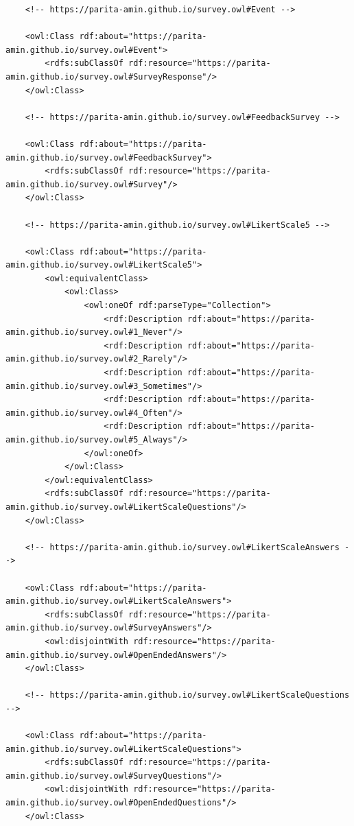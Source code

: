\begin{lstlisting}
    <!-- https://parita-amin.github.io/survey.owl#Event -->

    <owl:Class rdf:about="https://parita-amin.github.io/survey.owl#Event">
        <rdfs:subClassOf rdf:resource="https://parita-amin.github.io/survey.owl#SurveyResponse"/>
    </owl:Class>
    
    <!-- https://parita-amin.github.io/survey.owl#FeedbackSurvey -->

    <owl:Class rdf:about="https://parita-amin.github.io/survey.owl#FeedbackSurvey">
        <rdfs:subClassOf rdf:resource="https://parita-amin.github.io/survey.owl#Survey"/>
    </owl:Class>
    
    <!-- https://parita-amin.github.io/survey.owl#LikertScale5 -->

    <owl:Class rdf:about="https://parita-amin.github.io/survey.owl#LikertScale5">
        <owl:equivalentClass>
            <owl:Class>
                <owl:oneOf rdf:parseType="Collection">
                    <rdf:Description rdf:about="https://parita-amin.github.io/survey.owl#1_Never"/>
                    <rdf:Description rdf:about="https://parita-amin.github.io/survey.owl#2_Rarely"/>
                    <rdf:Description rdf:about="https://parita-amin.github.io/survey.owl#3_Sometimes"/>
                    <rdf:Description rdf:about="https://parita-amin.github.io/survey.owl#4_Often"/>
                    <rdf:Description rdf:about="https://parita-amin.github.io/survey.owl#5_Always"/>
                </owl:oneOf>
            </owl:Class>
        </owl:equivalentClass>
        <rdfs:subClassOf rdf:resource="https://parita-amin.github.io/survey.owl#LikertScaleQuestions"/>
    </owl:Class>
    
    <!-- https://parita-amin.github.io/survey.owl#LikertScaleAnswers -->

    <owl:Class rdf:about="https://parita-amin.github.io/survey.owl#LikertScaleAnswers">
        <rdfs:subClassOf rdf:resource="https://parita-amin.github.io/survey.owl#SurveyAnswers"/>
        <owl:disjointWith rdf:resource="https://parita-amin.github.io/survey.owl#OpenEndedAnswers"/>
    </owl:Class>
    
    <!-- https://parita-amin.github.io/survey.owl#LikertScaleQuestions -->

    <owl:Class rdf:about="https://parita-amin.github.io/survey.owl#LikertScaleQuestions">
        <rdfs:subClassOf rdf:resource="https://parita-amin.github.io/survey.owl#SurveyQuestions"/>
        <owl:disjointWith rdf:resource="https://parita-amin.github.io/survey.owl#OpenEndedQuestions"/>
    </owl:Class>
    

\end{lstlisting}
